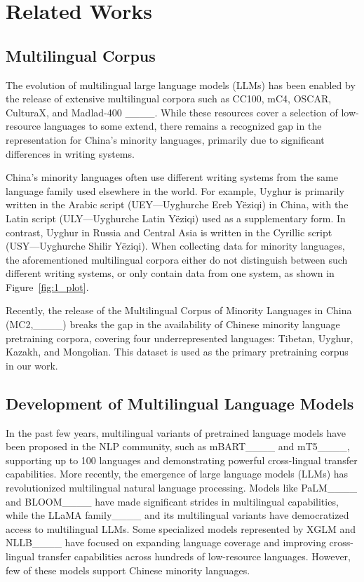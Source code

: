 \section{Related Works}
\label{sec:related-work}
\subsection{Multilingual Corpus}
The evolution of multilingual large language models (LLMs) has been enabled by the release of extensive multilingual corpora such as CC100, mC4, OSCAR, CulturaX, and Madlad-400 ____. While these resources cover a selection of low-resource languages to some extend, there remains a recognized gap in the representation for China's minority languages, primarily due to significant differences in writing systems.
   
China’s minority languages often use different writing systems from the same language family used elsewhere in the world. For example, Uyghur is primarily written in the Arabic script (UEY—Uyghurche Ereb Yëziqi) in China, with the Latin script (ULY—Uyghurche Latin Yëziqi) used as a supplementary form. In contrast, Uyghur in Russia and Central Asia is written in the Cyrillic script (USY—Uyghurche Shilir Yëziqi). When collecting data for minority languages, the aforementioned multilingual corpora either do not distinguish between such different writing systems, or only contain data from one system, as shown in Figure~\ref{fig:1_plot}.
   
Recently, the release of the Multilingual Corpus of Minority Languages in China (MC2,____) breaks the gap in the availability of Chinese minority language pretraining corpora, covering four underrepresented languages: Tibetan, Uyghur, Kazakh, and Mongolian. This dataset is used as the primary pretraining corpus in our work.

    
\subsection{Development of Multilingual Language Models}
In the past few years, multilingual variants of pretrained language models have been proposed in the NLP community, such as mBART____ and mT5____, supporting up to 100 languages and demonstrating powerful cross-lingual transfer capabilities. More recently, the emergence of large language models (LLMs) has revolutionized multilingual natural language processing. Models like PaLM____ and BLOOM____ have made significant strides in multilingual capabilities, while the LLaMA family____ and its multilingual variants have democratized access to multilingual LLMs. Some specialized models represented by XGLM and NLLB____ have focused on expanding language coverage and improving cross-lingual transfer capabilities across hundreds of low-resource languages. However, few of these models support Chinese minority languages.

